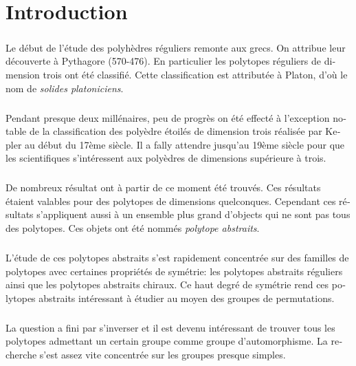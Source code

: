 \chapter*{Introduction}

\begin{otherlanguage}{french}

\paragraph{}
Le début de l'étude des polyhèdres réguliers remonte aux grecs. On attribue leur découverte à Pythagore (570-476). En particulier les  polytopes réguliers de dimension trois ont été classifié. Cette classification est attributée à Platon, d'où le nom de \textit{solides platoniciens}.

\paragraph{}
Pendant presque deux millénaires, peu de progrès on été effecté à l'exception notable de la classification des polyèdre étoilés de dimension trois réalisée par Kepler au début du 17ème siècle. Il a fally attendre jusqu'au 19ème siècle pour que les scientifiques s'intéressent aux polyèdres de dimensions supérieure à trois.

\paragraph{}
De nombreux résultat ont à partir de ce moment été trouvés. Ces résultats étaient valables pour des polytopes de dimensions quelconques. Cependant ces résultats s'appliquent aussi à un ensemble plus grand d'objects qui ne sont pas tous des polytopes. Ces objets ont été nommés \textit{polytope abstraits}.

\paragraph{}
L'étude de ces polytopes abstraits s'est rapidement concentrée sur des familles de polytopes avec certaines propriétés de symétrie: les polytopes abstraits réguliers ainsi que les polytopes abstraits chiraux. Ce haut degré de symétrie rend ces polytopes abstraits intéressant à étudier au moyen des groupes de permutations.

\paragraph{}
La question a fini par s'inverser et il est devenu intéressant de trouver tous les polytopes admettant un certain groupe comme groupe d'automorphisme. La recherche s'est assez vite concentrée sur les groupes presque simples.


\end{otherlanguage}
